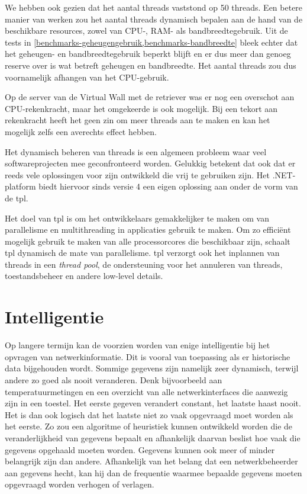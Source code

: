 We hebben ook gezien dat het aantal threads vaststond op 50 threads.
Een betere manier van werken zou het aantal threads dynamisch bepalen aan de hand van de beschikbare resources, zowel van CPU-, RAM- als bandbreedtegebruik.
Uit de tests in \cref{benchmarks-geheugengebruik,benchmarks-bandbreedte} bleek echter dat het geheugen- en bandbreedtegebruik beperkt blijft
en er dus meer dan genoeg reserve over is wat betreft geheugen en bandbreedte.
Het aantal threads zou dus voornamelijk afhangen van het CPU-gebruik.

Op de server van de Virtual Wall met de retriever was er nog een overschot aan CPU-rekenkracht,
maar het omgekeerde is ook mogelijk.
Bij een tekort aan rekenkracht heeft het geen zin om meer threads aan te maken en kan het mogelijk zelfs een averechts effect hebben.

Het dynamisch beheren van threads is een algemeen probleem waar veel softwareprojecten mee geconfronteerd worden.
Gelukkig betekent dat ook dat er reeds vele oplossingen voor zijn ontwikkeld die vrij te gebruiken zijn.
Het .NET-platform biedt hiervoor sinds versie 4 een eigen oplossing aan onder de vorm van de \gls{tpl}.

Het doel van \gls{tpl} is om het ontwikkelaars gemakkelijker te maken om van parallelisme en multithreading in applicaties gebruik te maken.
Om zo efficiënt mogelijk gebruik te maken van alle processorcores die beschikbaar zijn, schaalt \gls{tpl} dynamisch de mate van parallelisme.
\Gls{tpl} verzorgt ook het inplannen van threads in een \textit{thread pool}, de ondersteuning voor het annuleren van threads, toestandsbeheer en
andere low-level details\cite{msdn-tpl}.


\section{Intelligentie}

Op langere termijn kan de \nwmretriever{} voorzien worden van enige intelligentie bij het opvragen van netwerkinformatie.
Dit is vooral van toepassing als er historische data bijgehouden wordt.
Sommige gegevens zijn namelijk zeer dynamisch, terwijl andere zo goed als nooit veranderen.
Denk bijvoorbeeld aan temperatuurmetingen en een overzicht van alle netwerkinterfaces die aanwezig zijn in een toestel.
Het eerste gegeven verandert constant, het laatste haast nooit.
Het is dan ook logisch dat het laatste niet zo vaak opgevraagd moet worden als het eerste.
Zo zou een algoritme of heuristiek kunnen ontwikkeld worden die de veranderlijkheid van gegevens bepaalt en afhankelijk daarvan
beslist hoe vaak die gegevens opgehaald moeten worden.
Gegevens kunnen ook meer of minder belangrijk zijn dan andere.
Afhankelijk van het belang dat een netwerkbeheerder aan gegevens hecht, kan hij dan de frequentie waarmee bepaalde gegevens moeten opgevraagd worden verhogen of verlagen.



